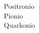 \documentclass[preview]{standalone}
\begin{document}
Positronio\\Pionio\\Quarkonio\\
\end{document}
